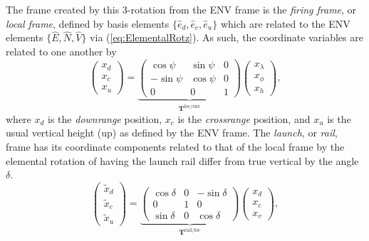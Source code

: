 \documentclass[11pt,dvipsnames]{thesis}
\begin{document}
The frame created by this 3-rotation from the ENV frame is the \textit{firing frame}, or \textit{local frame}, defined by basis elements $\{\hat{e}_d, \hat{e}_c, \hat{e}_u\}$ which are related to the ENV elements $\{\widehat{E}, \widehat{N}, \widehat{V}\}$ via (\ref{eq:ElementalRotz}). As such, the coordinate variables are related to one another by
\begin{equation}
\begin{pmatrix}x_d \\ x_c \\ x_u\end{pmatrix} = \underbrace{\begin{pmatrix}\cos\psi & \sin\psi & 0 \\ -\sin\psi & \cos\psi & 0 \\ 0 & 0 & 1\end{pmatrix}}_{\mathbf{T}^{\text{loc}/\text{env}}} \begin{pmatrix}x_{\lambda} \\ x_{\phi} \\ x_{h}\end{pmatrix},
\end{equation}
where $x_d$ is the \textit{downrange} position, $x_c$ is the \textit{crossrange} position, and $x_u$ is the usual vertical height (up) as defined by the ENV frame. 
%
The \textit{launch}, or \textit{rail}, frame has its coordinate components related to that of the local frame by the elemental rotation of having the launch rail differ from true vertical by the angle $\delta$.
\begin{equation}
\begin{pmatrix}\tilde{x}_d \\ \tilde{x}_c \\ \tilde{x}_u\end{pmatrix} = \underbrace{\begin{pmatrix}\cos\delta & 0 & -\sin\delta \\ 0 & 1 & 0 \\ \sin\delta & 0 & \cos\delta\end{pmatrix}}_{\mathbf{T}^{\text{rail}/\text{loc}}} \begin{pmatrix}x_d \\ x_c \\ x_v\end{pmatrix},
\end{equation}
\end{document}
